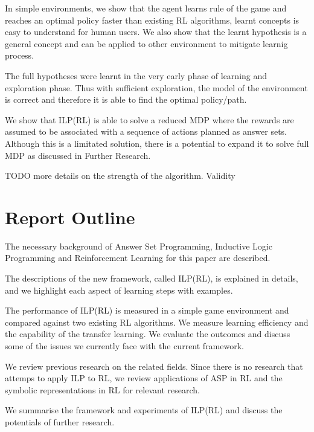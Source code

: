 In simple environments, we show that the agent learns rule of the game and reaches an optimal policy faster than existing RL algorithms, learnt concepts is easy to understand for human users.
We also show that the learnt hypothesis is a general concept and can be applied to other environment to mitigate learnig process.

The full hypotheses were learnt in the very early phase of learning and exploration phase. Thus with sufficient exploration, the model of the environment is correct
and therefore it is able to find the optimal policy/path. 

We show that ILP(RL) is able to solve a reduced MDP where the rewards are assumed to be associated with a sequence of actions planned as answer sets.
Although this is a limitated solution, there is a potential to expand it to solve full MDP as discussed in Further Research. 

TODO more details on the strength of the algorithm. 
Validity

\section{Report Outline}
\begin{customthm}{2}
The necessary background of Answer Set Programming, Inductive Logic Programming and Reinforcement Learning for this paper are described.
\end{customthm}

\begin{customthm}{3}
The descriptions of the new framework, called ILP(RL), is explained in details, and we highlight each aspect of learning steps with examples. 
\end{customthm}

\begin{customthm}{4}
The performance of ILP(RL) is measured in a simple game environment and compared against two existing RL algorithms. We measure learning efficiency and the capability of the transfer learning.
We evaluate the outcomes and discuss some of the issues we currently face with the current framework.
\end{customthm}

\begin{customthm}{5}
We review previous research on the related fields. Since there is no research that attemps to apply ILP to RL, we review  
applications of ASP in RL and the symbolic representations in RL for relevant research.  
\end{customthm}

\begin{customthm}{6}
We summarise the framework and experiments of ILP(RL) and discuss the potentials of further research. 
\end{customthm}
